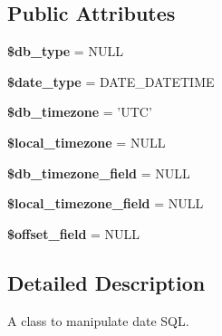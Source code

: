 \subsection*{Public Attributes}
\begin{DoxyCompactItemize}
\item 
\hypertarget{classdate__sql__handler_aea2e0163af65b516a62b308c1b49f446}{
{\bfseries \$db\_\-type} = NULL}
\label{classdate__sql__handler_aea2e0163af65b516a62b308c1b49f446}

\item 
\hypertarget{classdate__sql__handler_a148a9358a5600912051054452a3cb72a}{
{\bfseries \$date\_\-type} = DATE\_\-DATETIME}
\label{classdate__sql__handler_a148a9358a5600912051054452a3cb72a}

\item 
\hypertarget{classdate__sql__handler_a82a646578b36fa438d8541e6f93a7b51}{
{\bfseries \$db\_\-timezone} = 'UTC'}
\label{classdate__sql__handler_a82a646578b36fa438d8541e6f93a7b51}

\item 
\hypertarget{classdate__sql__handler_a1372c5a1a1897cbfb5d8d67c9bbd2b56}{
{\bfseries \$local\_\-timezone} = NULL}
\label{classdate__sql__handler_a1372c5a1a1897cbfb5d8d67c9bbd2b56}

\item 
\hypertarget{classdate__sql__handler_ae488522b2ee5ab385b3f69d0097d090a}{
{\bfseries \$db\_\-timezone\_\-field} = NULL}
\label{classdate__sql__handler_ae488522b2ee5ab385b3f69d0097d090a}

\item 
\hypertarget{classdate__sql__handler_a1e3daa04dd0d920dc01ff32a64e52d0d}{
{\bfseries \$local\_\-timezone\_\-field} = NULL}
\label{classdate__sql__handler_a1e3daa04dd0d920dc01ff32a64e52d0d}

\item 
\hypertarget{classdate__sql__handler_ad7072bcf1e48084764fadd66cf5d3cc6}{
{\bfseries \$offset\_\-field} = NULL}
\label{classdate__sql__handler_ad7072bcf1e48084764fadd66cf5d3cc6}

\end{DoxyCompactItemize}


\subsection{Detailed Description}
A class to manipulate date SQL. 

